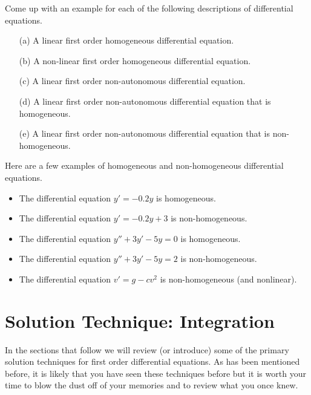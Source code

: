 \begin{problem}
    Come up with an example for each of the following descriptions of differential
    equations.
    \begin{enumerate}
        \item[(a)] A linear first order homogeneous differential equation.
        \item[(b)] A non-linear first order homogeneous differential equation.
        \item[(c)] A linear first order non-autonomous differential equation.
        \item[(d)] A linear first order non-autonomous differential equation that is
            homogeneous.
        \item[(e)] A linear first order non-autonomous differential equation that is
            non-homogeneous.
    \end{enumerate}
\end{problem}
\begin{example}
    Here are a few examples of homogeneous and non-homogeneous differential equations.
    \begin{itemize}
        \item The differential equation $y' = -0.2y$ is homogeneous.
        \item The differential equation $y' = -0.2y + 3$ is non-homogeneous.
        \item The differential equation $y'' + 3y' - 5y = 0$ is homogeneous.
        \item The differential equation $y'' + 3y' - 5y = 2$ is non-homogeneous.
        \item The differential equation $v' = g - c v^2$ is non-homogeneous (and
            nonlinear).
    \end{itemize}
\end{example}

\newpage
\section{Solution Technique: Integration}
In the sections that follow we will review (or introduce) some of the primary solution
techniques for first order differential equations.  As has been mentioned before, it is
likely that you have seen these techniques before but it is worth your time to blow the
dust off of your memories and to review what you once knew.  

